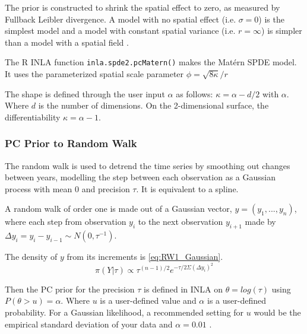 The prior is constructed to shrink the spatial effect to zero, as measured by Fullback Leibler divergence.  A model with no spatial effect (i.e. $\sigma = 0$) is the simplest model and a model with constant spatial variance (i.e. $r = \infty$)  is simpler than a model with a spatial field \citep{fuglstad2017constructing}.

The R \ac{INLA} function \verb|inla.spde2.pcMatern()| makes the Mat\'{e}rn \ac{SPDE} model.  It uses the parameterized spatial scale parameter $\phi = \sqrt{8\kappa}/r$


The shape is defined through the user input $\alpha$ as follows:  $\kappa = \alpha -d/2$ with $\alpha$.  Where $d$ is the number of dimensions.  On the 2-dimensional surface, the differentiability $\kappa = \alpha -1$.



\subsubsection*{PC Prior to Random Walk}
\label{subsubsec:pconranwalk}
The random walk is used to detrend the time series by smoothing out changes between years, modelling the step between each observation as a Gaussian process with mean 0 and precision $\tau$.  It is equivalent to a spline.

A random walk of order one is made out of a Gaussian vector, 
$y = (y_1, ..., y_n)$,  where each step from observation $y_i$ to the next observation $y_{i+1}$ made by $\Delta y_i = y_i - y_{i-1} \sim N(0, \tau^{-1})$.  

The density of $y$ from its increments is \ref{eq:RW1_Gaussian}.
\begin{equation} \label{eq:RW1_Gaussian}
\pi (Y|\tau) \propto \tau^{(n-1)/2} e^{-\tau/2 \Sigma (\Delta y_i)^2} 
\end{equation}


Then the \ac{PC} prior for the precision $\tau$ is defined in \ac{INLA} on $\theta = log(\tau)$ using $P(\theta > u) = \alpha$.  Where $u$ is a user-defined value and $\alpha$ is a user-defined probability.  For a Gaussian likelihood, a recommended setting for $u$ would be the empirical standard deviation of your data and $\alpha =0.01$  \citep{gomezGitBook}.

